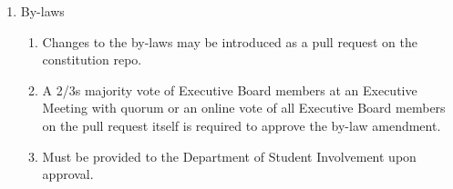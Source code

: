 \begin{enumerate}
  \item	By-laws
    \begin{enumerate}
      \item	Changes to the by-laws may be introduced as a pull request on the
        constitution repo.
      \item	A 2/3s majority vote of Executive Board members at an Executive
        Meeting with quorum or an online vote of all Executive Board members on
        the pull request itself is required to approve the by-law amendment.
      \item	Must be provided to the Department of Student Involvement upon
      approval.
    \end{enumerate}
\end{enumerate}
